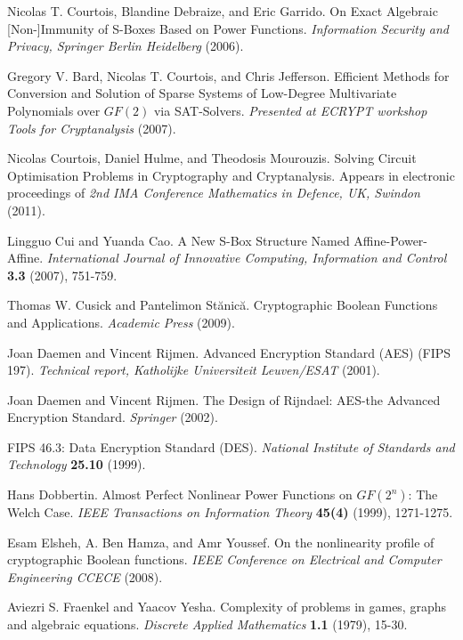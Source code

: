 \documentclass[11pt,american]{report}
\begin{document}
\begin{thebibliography}{9}
 Nicolas T. Courtois, Blandine Debraize, and Eric Garrido. On Exact Algebraic [Non-]Immunity of S-Boxes Based on Power Functions. \emph{Information Security and Privacy, Springer Berlin Heidelberg} (2006).

 Gregory V. Bard, Nicolas T. Courtois, and Chris Jefferson. Efficient Methods for Conversion and Solution of Sparse Systems of Low-Degree Multivariate Polynomials over $GF(2)$ via SAT-Solvers. \emph{Presented at ECRYPT workshop Tools for Cryptanalysis} (2007).

 Nicolas Courtois, Daniel Hulme, and Theodosis Mourouzis. Solving Circuit Optimisation Problems in Cryptography and Cryptanalysis. Appears in electronic proceedings of \emph{2nd IMA Conference Mathematics in Defence, UK, Swindon} (2011).

 Lingguo Cui and Yuanda Cao. A New S-Box Structure Named Affine-Power-Affine. \emph{International Journal of Innovative Computing, Information and Control} \textbf{3.3} (2007), 751-759.

 Thomas W. Cusick and Pantelimon St\u{a}nic\u{a}. Cryptographic Boolean Functions and Applications. 
\emph{Academic Press} (2009).

 Joan Daemen and Vincent Rijmen. Advanced Encryption Standard (AES) (FIPS 197). \emph{Technical report, 
Katholijke Universiteit Leuven/ESAT} (2001).

 Joan Daemen and Vincent Rijmen. The Design of Rijndael: AES-the Advanced Encryption Standard. \emph{Springer} (2002).

 FIPS 46.3: Data Encryption Standard (DES). \emph{National Institute of Standards and Technology} \textbf{25.10} (1999).

 Hans Dobbertin. Almost Perfect Nonlinear Power Functions on $GF(2^n)$: The Welch Case. \emph{IEEE Transactions on Information Theory} \textbf{45(4)} (1999), 1271-1275.

 Esam Elsheh, A. Ben Hamza, and Amr Youssef. On the nonlinearity profile of cryptographic Boolean functions. \emph{IEEE Conference on Electrical and Computer Engineering CCECE} (2008).

 Aviezri S. Fraenkel and Yaacov Yesha. Complexity of problems in games, graphs and algebraic equations. \emph{Discrete Applied Mathematics} \textbf{1.1} (1979), 15-30.


\end{thebibliography}
\end{document}
